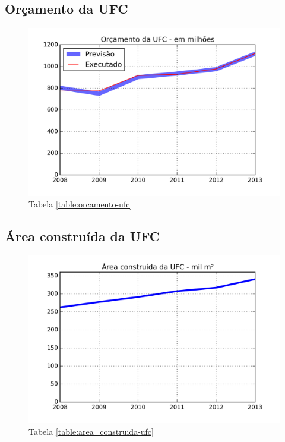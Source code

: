\documentclass{report}
\begin{document}
\subsection{Orçamento da UFC}

\begin{figure}[H]
	\includegraphics{img/orcamento_ufc.png}
	\caption{Tabela \ref{table:orcamento-ufc}}
	\label{img:orcamento-ufc}
\end{figure}

\subsection{Área construída da UFC}

\begin{figure}[H]
	\includegraphics{img/area_construida_ufc.png}
	\caption{Tabela \ref{table:area_construida-ufc}}
	\label{img:area_construida-ufc}
\end{figure}
\end{document}
